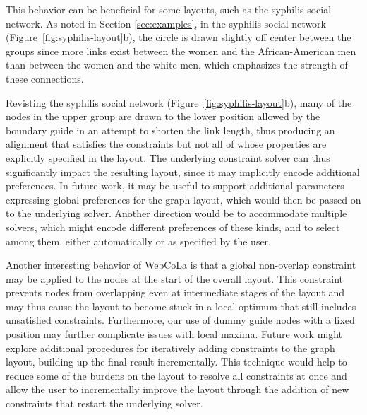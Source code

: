 This behavior can be beneficial for some layouts, such as the syphilis social network.
As noted in Section \ref{sec:examples}, in the syphilis social network
(Figure~\ref{fig:syphilis-layout}b), the circle is drawn slightly off
center between the groups since more links exist between the
women and the African-American men than between the women and
the white men, which emphasizes the strength of these
connections.

Revisting the syphilis social network
(Figure~\ref{fig:syphilis-layout}b), many of the nodes in the upper group
are drawn to the lower position allowed by the boundary guide in an attempt
to shorten the link length, thus producing an alignment that satisfies the
\projectname constraints but not all of whose properties are explicitly
specified in the layout. The underlying constraint solver can thus
significantly impact the resulting layout, since it may implicitly encode
additional preferences.  In future work, it may be useful to support
additional parameters expressing global preferences for the graph layout,
which would then be passed on to the underlying solver.  Another direction
would be to accommodate multiple solvers, which might encode different
preferences of these kinds, and to select among them, either automatically
or as specified by the user.

Another interesting behavior of WebCoLa is that a global non-overlap constraint
may be applied to the nodes at the start of the overall layout. This constraint
prevents nodes from overlapping even at intermediate stages of the layout and
may thus cause the layout to become stuck in a local optimum that still
includes unsatisfied constraints. Furthermore, our use of
dummy guide nodes with a fixed position may further complicate issues
with local maxima. Future work might explore additional procedures for
iteratively adding constraints to the graph layout, building up the final
result incrementally. This technique would help to reduce some of the burdens
on the layout to resolve all constraints at once and allow the user to
incrementally improve the layout through the addition of new constraints
that restart the underlying solver.
